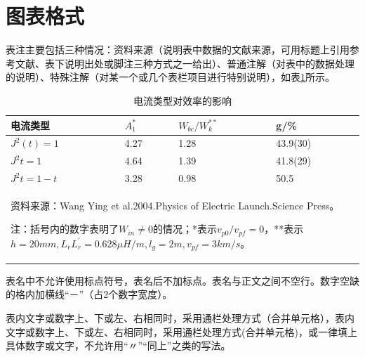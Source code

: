 \documentclass{cqupt_thesis}
\begin{document}
    \section{图表格式}
    表注主要包括三种情况：资料来源（说明表中数据的文献来源，可用标题上引用参考文献、表下说明出处或脚注三种方式之一给出）、普通注解（对表中的数据处理的说明）、特殊注解（对某一个或几个表栏项目进行特别说明），如表\ref{电流类型对效率的影响}所示。
    \begin{table}[H]%
    	\centering
    	\caption{电流类型对效率的影响}
    	\label{电流类型对效率的影响}
    	\begin{tabular}{p{3.5cm}p{3.5cm}p{3.5cm}p{3.5cm}} 
    		\hline
    		电流类型                 &  {$ A_1^* $}                      & {$ W_{bc}/W_k^{**} $}    &  {g/\%}     \\ 
    		\hline
    		{$ J^2(t)=1 $}    & 4.27                               & 1.28                  & 43.9(30)            \\
    		{$ J^2t=1 $}      & 4.64                               & 1.39                  & 41.8(29)            \\
    		{$ J^2t=1-t $}    & 3.28                               & 0.98                  & 50.5                \\
    		\hline
    		\multicolumn{4}{p{15cm}}{
    			资料来源：Wang Ying et al.2004.Physics of Electric Launch.Science Press。
    			
    			注：括号内的数字表明了$ W_{in}\neq0 $的情况；*表示$ v_{p0}/v_{pf}=0 $，**表示$ h=20mm,L_rL_r^\prime=0.628\mu H/m,l_g=2m,v_{pf}=3km/s $。
    		}
    	\end{tabular}
    \end{table}
	表名中不允许使用标点符号，表名后不加标点。表名与正文之间不空行。数字空缺的格内加横线“－”（占2个数字宽度）。
	
	表内文字或数字上、下或左、右相同时，采用通栏处理方式（合并单元格），表内文字或数字上、下或左、右相同时，采用通栏处理方式(合并单元格)，或一律填上具体数字或文字，不允许用“〃”“同上”之类的写法。
	
\end{document}
